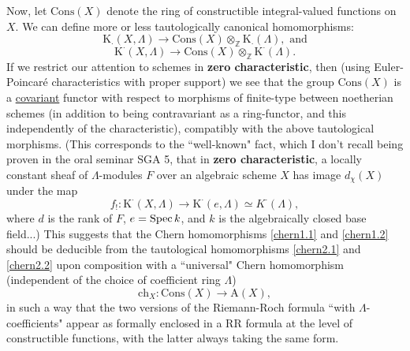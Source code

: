 Now, let $\text{Cons}(X)$ denote the ring of constructible integral-valued functions on $X$. We can define more or less tautologically canonical homomorphisms:
\begin{equation}\label{chern2.1} 
\text{K}_{\cdot}(X, \Lambda) \to \text{Cons}(X) \otimes_{\mathbb{Z}} \text{K}_\cdot(\Lambda), \text{ and} 
\end{equation}
\begin{equation}\label{chern2.2} 
\text{K}^{\cdot}(X, \Lambda) \to \text{Cons}(X) \otimes_{\mathbb{Z}} \text{K}^\cdot(\Lambda). 
\end{equation}
If we restrict our attention to schemes in \textbf{zero characteristic}, then (using Euler-Poincar\'e characteristics with proper support) we see that the group $\text{Cons}(X)$ is a \underline{covariant} functor with respect to morphisms of finite-type between noetherian schemes (in addition to being contravariant as a ring-functor, and this independently of the characteristic), compatibly with the above tautological morphisms. (This corresponds to the ``well-known" fact, which I don't recall being proven in the oral seminar SGA 5, that in \textbf{zero characteristic}, a locally constant sheaf of $\Lambda$-modules $F$ over an algebraic scheme $X$ has image $d_\chi(X)$ under the map 
$$ f_!: \text{K}^{\cdot}(X, \Lambda) \to \text{K}^{\cdot}(e, \Lambda) \simeq K^\cdot(\Lambda), $$
where $d$ is the rank of $F$, $e = \operatorname{Spec} k$, and $k$ is the algebraically closed base field...) This suggests that the Chern homomorphisms \ref{chern1.1} and \ref{chern1.2} should be deducible from the tautological homomorphisms \ref{chern2.1} and \ref{chern2.2} upon composition with a ``universal" Chern homomorphism (independent of the choice of coefficient ring $\Lambda$)
$$ \text{ch}_X: \text{Cons}(X) \to \text{A}(X), $$
in such a way that the two versions of the Riemann-Roch formula ``with $\Lambda$-coefficients" appear as formally enclosed in a RR formula at the level of constructible functions, with the latter always taking the same form.


